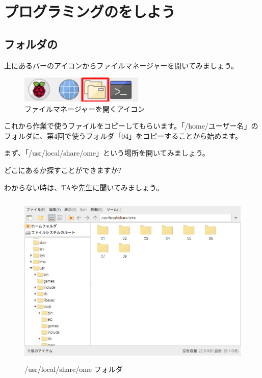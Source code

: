 

\section{プログラミングのをしよう}

\subsection{フォルダの}
\bigskip
\bigskip

上にあるバーのアイコンからファイルマネージャーを開いてみましょう。


\begin{figure}[H]
  \begin{center}
    \includegraphics[keepaspectratio,width=5.898cm,height=1.242cm]{text04-img/s_filemanager.png}
    \caption{ファイルマネージャーを開くアイコン}
  \end{center}
  \label{fig:prog_menu}
\end{figure}

これから作業で使うファイルをコピーしてもらいます。「/home/ユーザー名」のフォルダに、第4回で使うフォルダ「04」をコピーすることから始めます。

まず、「/usr/local/share/ome」という場所を開いてみましょう。

どこにあるか探すことができますか?

わからない時は、TAや先生に聞いてみましょう。


\begin{figure}[H]
  \begin{center}
    \includegraphics[keepaspectratio,width=11.232cm,height=8.424cm]{text04-img/s_ome04a.png}
    \caption{/usr/local/share/ome フォルダ}
  \end{center}
  \label{fig:prog_menu}
\end{figure}

